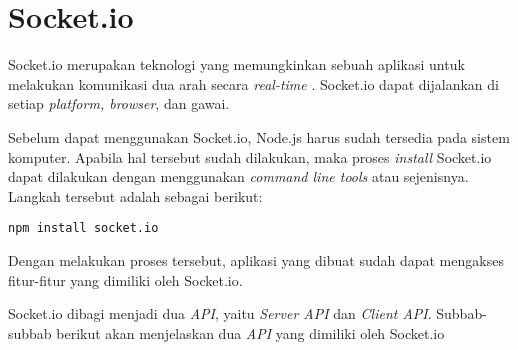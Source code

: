 %
%
%	
%	
%	


\section{Socket.io}
\label{sec:Socket.io}

Socket.io merupakan teknologi yang memungkinkan sebuah aplikasi untuk melakukan komunikasi dua arah secara \textit{real-time} \cite{rauch:11:socketiodocs}. Socket.io dapat dijalankan di setiap \textit{platform, browser}, dan gawai.

Sebelum dapat menggunakan Socket.io, Node.js harus sudah tersedia pada sistem komputer. Apabila hal tersebut sudah dilakukan, maka proses \textit{install} Socket.io dapat dilakukan dengan menggunakan \textit{command line tools} atau sejenisnya. Langkah tersebut adalah sebagai berikut:
\begin{lstlisting}
npm install socket.io
\end{lstlisting}

Dengan melakukan proses tersebut, aplikasi yang dibuat sudah dapat mengakses fitur-fitur yang dimiliki oleh Socket.io.

Socket.io dibagi menjadi dua \textit{API}, yaitu \textit{Server API} dan \textit{Client API}. Subbab-subbab berikut akan menjelaskan dua \textit{API} yang dimiliki oleh Socket.io

